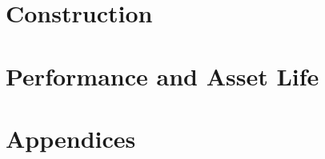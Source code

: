 \documentclass[graybox,envcountchap,sectrefs]{SNmono}
\begin{document}
\part{Construction}\label{part:construction}





\part{Performance and Asset Life}\label{part:performance}




\appendix
\part{Appendices}\label{part:appendices}








\backmatter
\end{document}
